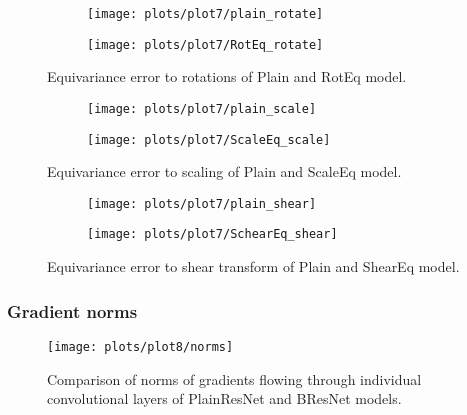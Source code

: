     \begin{figure}[h]
    \begin{adjustwidth}{-11em}{-11em}
        \centering
        \begin{subfigure}{0.6\textwidth}
            \texttt{[image: plots/plot7/plain\_rotate]}
        \end{subfigure}
        \begin{subfigure}{0.6\textwidth}
            \texttt{[image: plots/plot7/RotEq\_rotate]}
        \end{subfigure}
    \end{adjustwidth}
        \caption{Equivariance error to rotations of Plain and RotEq
        model.}
        \label{fig:plot7rot}
    \end{figure}


    \begin{figure}[h]
        \centering
        \begin{subfigure}{0.4\textwidth}
            \texttt{[image: plots/plot7/plain\_scale]}
        \end{subfigure}
        \begin{subfigure}{0.4\textwidth}
            \texttt{[image: plots/plot7/ScaleEq\_scale]}
        \end{subfigure}
        \caption{Equivariance error to scaling of Plain and ScaleEq
        model.}
        \label{fig:plot7scale}
    \end{figure}


    \begin{figure}[h]
        \centering
        \begin{subfigure}{0.4\textwidth}
            \texttt{[image: plots/plot7/plain\_shear]}
        \end{subfigure}
        \begin{subfigure}{0.4\textwidth}
            \texttt{[image: plots/plot7/SchearEq\_shear]}
        \end{subfigure}
        \caption{Equivariance error to shear transform of Plain and ShearEq
        model.}
        \label{fig:plot7shear}
    \end{figure}


    \subsubsection*{Gradient norms}
    \begin{figure}[h]
        \centering
        \texttt{[image: plots/plot8/norms]}
        \caption{Comparison of norms of gradients flowing through individual
            convolutional layers of PlainResNet and BResNet models.}
        \label{fig:plot8}
    \end{figure}


